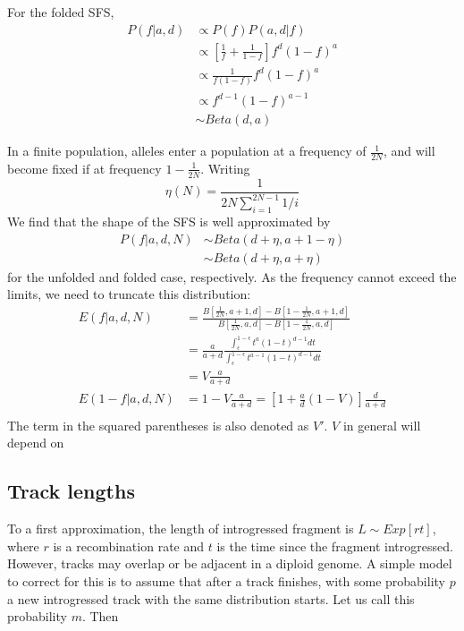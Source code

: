 \documentclass[10pt,a4paper]{article}
\begin{document}
For the folded SFS,
\begin{align}
P(f | a, d) &\propto P(f) P(a, d|f) \nonumber\\
&\propto \left[ \frac{1}{f} + \frac{1}{1-f}\right] f^d (1-f)^a\nonumber\\
&\propto \frac{1}{f(1-f)} f^d (1-f)^a\nonumber\\
&\propto f^{d-1} (1-f)^{a-1} \nonumber\\
&\sim Beta(d, a)
\end{align}

In a finite population, alleles enter a population at a frequency of $\frac{1}{2N}$, and will become fixed if at frequency $1-\frac{1}{2N}$. Writing
$$\eta(N) = \frac{1}{2N \sum_{i=1}^{2N-1}1/i}$$
We find that the shape of the SFS is well approximated by 
\begin{align}
P(f | a, d, N) &\sim Beta(d + \eta, a+1 - \eta)\\
&\sim Beta(d + \eta, a + \eta)
\end{align}
for the unfolded and folded case, respectively. As the frequency cannot exceed the limits, we need to truncate this distribution:
\begin{align}
E(f | a, d, N) &= \frac{B[\frac{1}{2N}, a+1, d]-B[1-\frac{1}{2N}, a+1, d]}{B[\frac{1}{2N}, a, d]-B[1-\frac{1}{2N}, a, d]}\nonumber\\
&= \frac{a}{a+d} \frac{\int_\epsilon^{1-\epsilon} t^a(1-t)^{d-1}dt}
{\int_\epsilon^{1-\epsilon} t^{a-1}(1-t)^{d-1}dt}\nonumber\\
&= V \frac{a}{a+d}\\
E(1-f | a, d, N)&= 1-V\frac{a}{a+d} = \left[1 + \frac{a}{d} (1-V)\right] \frac{d}{a+d}\\
\end{align}
The term in the squared parentheses is also denoted as $V'$. $V$ in general will depend on 
		
\subsection{Track lengths}
To a first approximation, the length of introgressed fragment is 
$L \sim Exp[r t ]$, where $r$ is a recombination rate and $t$ is the time since the fragment introgressed. However, tracks may overlap or be adjacent in a diploid genome. A simple model to correct for this is to assume that after a track finishes, with some probability $p$ a new introgressed track with the same distribution starts. Let us call this probability $m$. Then
\end{document}
